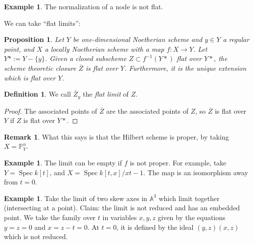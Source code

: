 \documentclass[10pt]{article}
\newtheorem{prop}[thm]{Proposition}
\newtheorem{cor}[thm]{Corollary}
\theoremstyle{definition}
\newtheorem{exmp}[thm]{Example}
\newtheorem{defn}[thm]{Definition}
\newtheorem{rmk}[thm]{Remark}
\DeclareMathOperator{\Spec}{Spec}
\newcommand{\PP}{\mathbb{P}}
\begin{document}


\begin{exmp}
The normalization of a node is not flat.
\end{exmp}

We can take ``flat limits'':
\begin{prop}
Let $Y$ be one-dimensional Noetherian scheme and $y \in Y$ a regular point, and $X$ a locally Noetherian scheme with a map $f: X \rightarrow Y$.  Let $Y* := Y - \{y\}$.  Given a closed subscheme $Z \subset f^{-1}(Y*)$ flat over $Y*$, the scheme theoretic closure $\overline{Z}$ is flat over $Y$.  Furthermore, it is the unique extension which is flat over $Y$.
\end{prop}

\begin{defn}
We call $\overline{Z}_y$ the \emph{flat limit} of $Z$.
\end{defn}

\begin{proof}
The associated points of $\overline{Z}$ are the associated points of $Z$, so $\overline{Z}$ is flat over $Y$ if $Z$ is flat over $Y*$.
\end{proof}

\begin{rmk}
What this says is that the Hilbert scheme is proper, by taking $X = \PP^n_Y$.
\end{rmk}

\begin{exmp}
The limit can be empty if $f$ is not proper.  For example, take $Y = \Spec k[t]$, and $X = \Spec k[t, x]/xt-1$.  The map is an isomorphism away from $t=0$.
\end{exmp}

\begin{exmp}
Take the limit of two skew axes in $\mathbb{A}^3$ which limit together (intersecting at a point).  Claim: the limit is not reduced and has an embedded point.  We take the family over $t$ in variables $x,y,z$ given by the equations $y=z=0$ and $x=z-t=0$.  At $t = 0$, it is defined by the ideal $(y,z)(x,z)$ which is not reduced.
\end{exmp}
\end{document}
